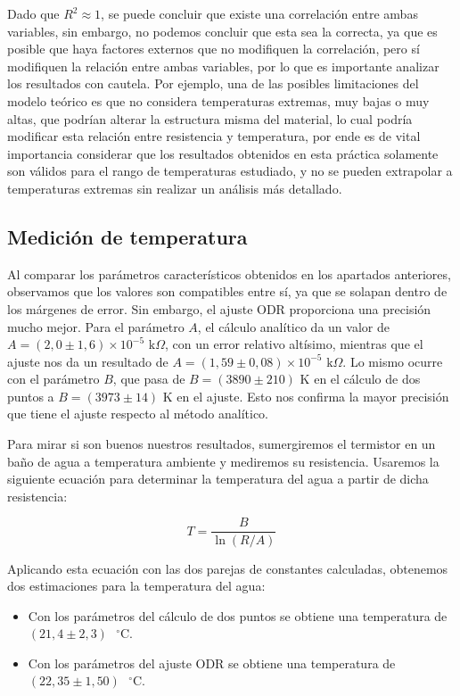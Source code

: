 \documentclass[11pt,a4paper]{article}
\begin{document}
Dado que $R^2 \approx 1$, se puede concluir que existe una correlación entre ambas variables, sin embargo, no podemos concluir que esta sea la correcta,
ya que es posible que haya factores externos que no modifiquen la correlación, pero sí modifiquen la relación entre ambas variables, por lo que es importante analizar los resultados con cautela.
Por ejemplo, una de las posibles limitaciones del modelo teórico es que no considera temperaturas extremas, muy bajas o muy altas, que podrían alterar la estructura misma del material,
lo cual podría modificar esta relación entre resistencia y temperatura, por ende es de vital importancia considerar que los resultados obtenidos en esta práctica
solamente son válidos para el rango de temperaturas estudiado, y no se pueden extrapolar a temperaturas extremas sin realizar un análisis más detallado.
\subsection{Medición de temperatura}
Al comparar los parámetros característicos obtenidos en los apartados anteriores, observamos que los valores son compatibles entre sí, ya que se solapan dentro de los márgenes de error. Sin embargo, el ajuste ODR proporciona una precisión mucho mejor. Para el parámetro $A$, el cálculo analítico da un valor de $A = (2,0 \pm 1,6) \times 10^{-5} \text{ k}\Omega$, con un error relativo altísimo, mientras que el ajuste nos da un resultado de $A = (1,59 \pm 0,08) \times 10^{-5} \text{ k}\Omega$. Lo mismo ocurre con el parámetro $B$, que pasa de $B = (3890 \pm 210) \text{ K}$ en el cálculo de dos puntos a $B = (3973 \pm 14) \text{ K}$ en el ajuste. Esto nos confirma la mayor precisión que tiene el ajuste respecto al método analítico.

Para mirar si son buenos nuestros resultados, sumergiremos el termistor en un baño de agua a temperatura ambiente y mediremos su resistencia. Usaremos la siguiente ecuación para determinar la temperatura del agua a partir de dicha resistencia:

\begin{equation}
T = \frac{B}{\ln(R/A)}
\end{equation}

Aplicando esta ecuación con las dos parejas de constantes calculadas, obtenemos dos estimaciones para la temperatura del agua:
\begin{itemize}
    \item Con los parámetros del cálculo de dos puntos se obtiene una temperatura de $(21,4 \pm 2,3) \text{ }^{\circ}\text{C}$.
    \item Con los parámetros del ajuste ODR se obtiene una temperatura de $(22,35 \pm 1,50) \text{ }^{\circ}\text{C}$.
\end{itemize}
\end{document}
